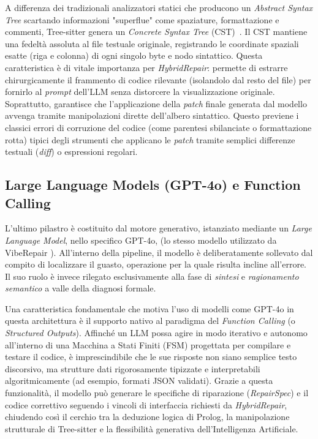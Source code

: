 A differenza dei tradizionali analizzatori statici che producono un \textit{Abstract Syntax Tree} scartando 
informazioni "superflue" come spaziature, formattazione e commenti, Tree-sitter genera un \textit{Concrete Syntax Tree} (CST)~\cite{aho2006compilers}.
Il CST mantiene una fedeltà assoluta al file testuale originale, registrando le coordinate spaziali esatte 
(riga e colonna) di ogni singolo byte e nodo sintattico. 
Questa caratteristica è di vitale importanza per \textit{HybridRepair}: permette di estrarre chirurgicamente il 
frammento di codice rilevante (isolandolo dal resto del file) per fornirlo al \textit{prompt} dell'LLM senza 
distorcere la visualizzazione originale. Soprattutto, garantisce che l'applicazione della \textit{patch} finale 
generata dal modello avvenga tramite manipolazioni dirette dell'albero sintattico. Questo previene i classici errori 
di corruzione del codice (come parentesi sbilanciate o formattazione rotta) tipici degli strumenti che applicano le 
\textit{patch} tramite semplici differenze testuali (\textit{diff}) o espressioni regolari.

\subsection{Large Language Models (GPT-4o) e Function Calling}
L'ultimo pilastro è costituito dal motore generativo, istanziato mediante un \textit{Large Language Model}, 
nello specifico GPT-4o, (lo stesso modello utilizzato da VibeRepair \cite{zhu2026specification}). All'interno della pipeline, il modello è deliberatamente sollevato dal compito di localizzare il guasto, 
operazione per la quale risulta incline all'errore. Il suo ruolo è invece rilegato 
esclusivamente alla fase di \textit{sintesi} e \textit{ragionamento semantico} a valle della diagnosi formale.

Una caratteristica fondamentale che motiva l'uso di modelli come GPT-4o in questa architettura è il supporto 
nativo al paradigma del \textit{Function Calling} (o \textit{Structured Outputs}). Affinché un LLM possa agire in modo 
iterativo e autonomo all'interno di una Macchina a Stati Finiti (FSM) progettata per compilare e testare il codice, è 
imprescindibile che le sue risposte non siano semplice testo discorsivo, ma strutture dati rigorosamente tipizzate e 
interpretabili algoritmicamente (ad esempio, formati JSON validati). Grazie a questa funzionalità, il modello può generare le 
specifiche di riparazione (\textit{RepairSpec}) e il codice correttivo seguendo i vincoli di interfaccia 
richiesti da \textit{HybridRepair}, chiudendo così il cerchio tra la deduzione logica di Prolog, la manipolazione strutturale 
di Tree-sitter e la flessibilità generativa dell'Intelligenza Artificiale.